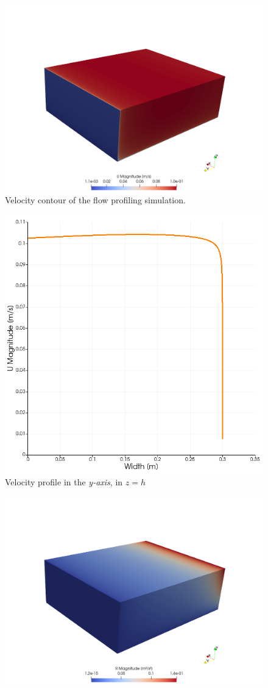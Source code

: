 \begin{refsection}
\begin{figure}[!ht]
  \centering
  \includegraphics[width=\linewidth]{../images/methods/flowProfVelocity.png}
  \caption{Velocity contour of the flow profiling simulation.}
  \label{fig:flowProfVel}
\end{figure}
\begin{figure}[!ht]
  \centering
  \includegraphics[width=0.5\linewidth]{../images/methods/flowProfVelocityChart.png}
  \caption{Velocity profile in the \textit{y-axis}, in $z=h$}
  \label{fig:flowProfVelChart}
\end{figure}
\begin{figure}[!ht]
  \centering
  \includegraphics[width=\linewidth]{../images/methods/flowProfReynoldsStress.png}

\end{figure}
\end{refsection}
